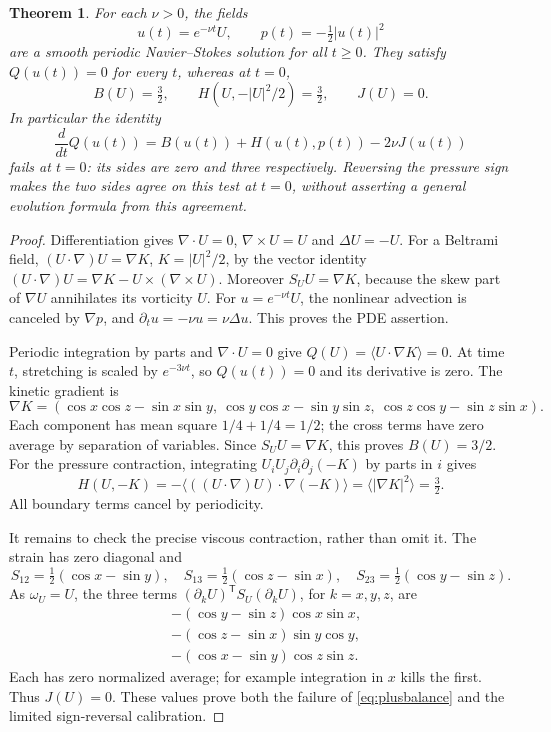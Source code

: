 \documentclass[11pt]{article}
\newtheorem{theorem}{Theorem}[section]
\begin{document}
\begin{theorem}\label{thm:ABC}
For each $\nu>0$, the fields
\[
 u(t)=e^{-\nu t}U,\qquad p(t)=-\tfrac12|u(t)|^2
\]
are a smooth periodic Navier--Stokes solution for all $t\geq0$.
They satisfy $Q(u(t))=0$ for every $t$, whereas at $t=0$,
\begin{equation}\label{eq:ABCvalues}
 B(U)=\tfrac32,\qquad H(U,-|U|^2/2)=\tfrac32,\qquad J(U)=0.
\end{equation}
In particular the identity
\begin{equation}\label{eq:plusbalance}
 \frac{d}{dt}Q(u(t))=B(u(t))+H(u(t),p(t))-2\nu J(u(t))
\end{equation}
fails at $t=0$: its sides are zero and three respectively. Reversing the
pressure sign makes the two sides agree on this test at $t=0$, without
asserting a general evolution formula from this agreement.
\end{theorem}
\begin{proof}
Differentiation gives $\nabla\cdot U=0$, $\nabla\times U=U$ and
$\Delta U=-U$. For a Beltrami field,
$(U\cdot\nabla)U=\nabla K$, $K=|U|^2/2$, by the vector identity
$(U\cdot\nabla)U=\nabla K-U\times(\nabla\times U)$.
Moreover $S_U U=\nabla K$, because the skew part of $\nabla U$
annihilates its vorticity $U$. For $u=e^{-\nu t}U$, the nonlinear
advection is canceled by $\nabla p$, and
$\partial_tu=-\nu u=\nu\Delta u$. This proves the PDE assertion.

Periodic integration by parts and $\nabla\cdot U=0$ give
$Q(U)=\langle U\cdot\nabla K\rangle=0$. At time $t$, stretching is
scaled by $e^{-3\nu t}$, so $Q(u(t))=0$ and its derivative is zero.
The kinetic gradient is
\[
 \nabla K=(\cos x\cos z-\sin x\sin y,
 \ \cos y\cos x-\sin y\sin z,
 \ \cos z\cos y-\sin z\sin x).
\]
Each component has mean square $1/4+1/4=1/2$; the cross terms have
zero average by separation of variables. Since $S_UU=\nabla K$,
this proves $B(U)=3/2$.
For the pressure contraction, integrating $U_iU_j\partial_i\partial_j(-K)$
by parts in $i$ gives
\[
 H(U,-K)=-\langle((U\cdot\nabla)U)\cdot\nabla(-K)\rangle
 =\langle|\nabla K|^2\rangle=\tfrac32.
\]
All boundary terms cancel by periodicity.

It remains to check the precise viscous contraction, rather than omit it.
The strain has zero diagonal and
\[
 S_{12}=\tfrac12(\cos x-\sin y),\quad
 S_{13}=\tfrac12(\cos z-\sin x),\quad
 S_{23}=\tfrac12(\cos y-\sin z).
\]
As $\omega_U=U$, the three terms
$(\partial_kU)^{\mathsf T}S_U(\partial_kU)$, for $k=x,y,z$, are
\begin{align*}
 &-(\cos y-\sin z)\cos x\sin x,\\
 &-(\cos z-\sin x)\sin y\cos y,\\
 &-(\cos x-\sin y)\cos z\sin z.
\end{align*}
Each has zero normalized average; for example integration in $x$ kills
the first. Thus $J(U)=0$. These values prove both the failure of
\eqref{eq:plusbalance} and the limited sign-reversal calibration.
\end{proof}
\end{document}
